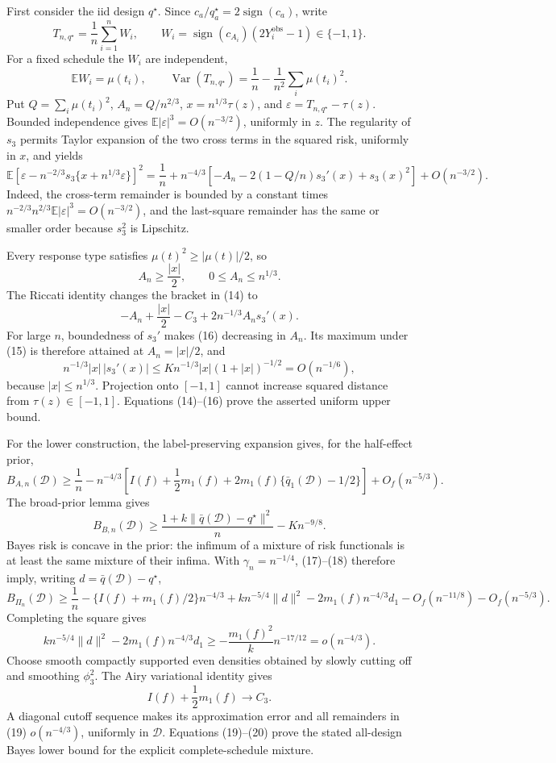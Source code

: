 First consider the iid design \(q^\star\).  Since \(c_a/q_a^\star=2\operatorname{sign}(c_a)\), write
\[
T_{n,q^\star}=\frac1n\sum_{i=1}^n W_i,\qquad
W_i=\operatorname{sign}(c_{A_i})(2Y_i^{\mathrm{obs}}-1)\in\{-1,1\}.
\]
For a fixed schedule the \(W_i\) are independent,
\[
\mathbb EW_i=\mu(t_i),\qquad
\operatorname{Var}(T_{n,q^\star})
=\frac1n-\frac1{n^2}\sum_i\mu(t_i)^2.
\tag{13}
\]
Put \(Q=\sum_i\mu(t_i)^2\), \(A_n=Q/n^{2/3}\), \(x=n^{1/3}\tau(z)\), and \(\varepsilon=T_{n,q^\star}-\tau(z)\).  Bounded independence gives \(\mathbb E|\varepsilon|^3=O(n^{-3/2})\), uniformly in \(z\).  The regularity of \(s_3\) permits Taylor expansion of the two cross terms in the squared risk, uniformly in \(x\), and yields
\[
\mathbb E\!\left[
\varepsilon-n^{-2/3}s_3\{x+n^{1/3}\varepsilon\}
\right]^2
=\frac1n+n^{-4/3}
\left[-A_n-2(1-Q/n)s_3'(x)+s_3(x)^2\right]
+O(n^{-3/2}).
\tag{14}
\]
Indeed, the cross-term remainder is bounded by a constant times
\(n^{-2/3}n^{2/3}\mathbb E|\varepsilon|^3=O(n^{-3/2})\), and the last-square remainder has the same or smaller order because \(s_3^2\) is Lipschitz.

Every response type satisfies \(\mu(t)^2\geq|\mu(t)|/2\), so
\[
A_n\geq\frac{|x|}{2},\qquad 0\leq A_n\leq n^{1/3}.
\tag{15}
\]
The Riccati identity changes the bracket in (14) to
\[
-A_n+\frac{|x|}{2}-C_3+2n^{-1/3}A_ns_3'(x).
\tag{16}
\]
For large \(n\), boundedness of \(s_3'\) makes (16) decreasing in \(A_n\).  Its maximum under (15) is therefore attained at \(A_n=|x|/2\), and
\[
n^{-1/3}|x|\,|s_3'(x)|
\leq K n^{-1/3}|x|(1+|x|)^{-1/2}
=O(n^{-1/6}),
\]
because \(|x|\leq n^{1/3}\).  Projection onto \([-1,1]\) cannot increase squared distance from \(\tau(z)\in[-1,1]\).  Equations (14)--(16) prove the asserted uniform upper bound.

For the lower construction, the label-preserving expansion gives, for the half-effect prior,
\[
B_{A,n}(\mathcal D)\geq
\frac1n-n^{-4/3}
\left[I(f)+\frac12m_1(f)+2m_1(f)
\{\bar q_1(\mathcal D)-1/2\}\right]
+O_f(n^{-5/3}).
\tag{17}
\]
The broad-prior lemma gives
\[
B_{B,n}(\mathcal D)\geq
\frac{1+k\|\bar q(\mathcal D)-q^\star\|^2}{n}
-Kn^{-9/8}.
\tag{18}
\]
Bayes risk is concave in the prior: the infimum of a mixture of risk functionals is at least the same mixture of their infima.  With \(\gamma_n=n^{-1/4}\), (17)--(18) therefore imply, writing \(d=\bar q(\mathcal D)-q^\star\),
\[
B_{\Pi_n}(\mathcal D)\geq
\frac1n-\{I(f)+m_1(f)/2\}n^{-4/3}
+k n^{-5/4}\|d\|^2
-2m_1(f)n^{-4/3}d_1
-O_f(n^{-11/8})-O_f(n^{-5/3}).
\tag{19}
\]
Completing the square gives
\[
k n^{-5/4}\|d\|^2-2m_1(f)n^{-4/3}d_1
\geq-\frac{m_1(f)^2}{k}n^{-17/12}
=o(n^{-4/3}).
\tag{20}
\]
Choose smooth compactly supported even densities obtained by slowly cutting off and smoothing \(\phi_3^2\).  The Airy variational identity gives
\[
I(f)+\frac12m_1(f)\longrightarrow C_3.
\]
A diagonal cutoff sequence makes its approximation error and all remainders in (19) \(o(n^{-4/3})\), uniformly in \(\mathcal D\).  Equations (19)--(20) prove the stated all-design Bayes lower bound for the explicit complete-schedule mixture.


